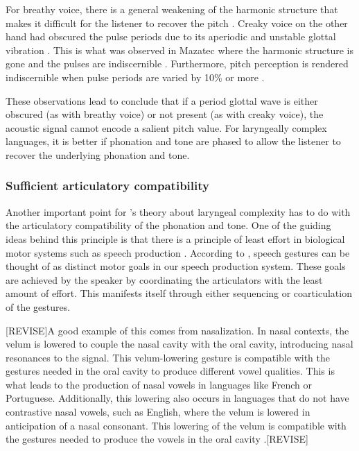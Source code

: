 For breathy voice, there is a general weakening
of the harmonic structure that makes it difficult for the listener to recover the pitch \citep{silvermanPhasingRecoverability1997}. Creaky voice on the other hand had obscured the pulse periods due to its aperiodic and unstable glottal vibration \citep{ladefogedSoundsWorldsLanguages1996}. This is what was observed in Mazatec where the harmonic structure is gone and the pulses are indiscernible \citep{kirkQuantifyingAcousticProperties1993}. Furthermore, pitch perception is rendered indiscernible when pulse periods are varied by 10\% or more \citep{rosenbergPitchDiscriminationJittered1966}.

These observations lead \citet{silvermanLaryngealComplexityOtomanguean1997} to conclude that if a period glottal wave is either obscured (as with breathy voice) or not present (as with creaky voice), the acoustic signal cannot encode a salient pitch value. For laryngeally complex languages, it is better if phonation and tone are phased to allow the listener to recover the underlying phonation and tone.

\subsubsection{Sufficient articulatory compatibility}\label{sec:sufficient_articulatory_compatibility}

Another important point for \citeauthor{silvermanLaryngealComplexityOtomanguean1997}'s theory about laryngeal complexity has to do with the articulatory compatibility of the phonation and tone. One of the guiding ideas behind this principle is that there is a principle of least effort in biological motor systems such as speech production \citep{lindblomEconomySpeechGestures1983}. According to \citet{lindblomEconomySpeechGestures1983}, speech gestures can be thought of as distinct motor goals in our speech production system. These goals are achieved by the speaker by coordinating the articulators with the least amount of effort. This manifests itself through either sequencing or coarticulation of the gestures.

[REVISE]A good example of this comes from nasalization. In nasal contexts, the velum is lowered to couple the nasal cavity with the oral cavity, introducing nasal resonances to the signal. This velum-lowering gesture is compatible with the gestures needed in the oral cavity to produce different vowel qualities. This is what leads to the production of nasal vowels in languages like French or Portuguese. Additionally, this lowering also occurs in languages that do not have contrastive nasal vowels, such as English, where the velum is lowered in anticipation of a nasal consonant. This lowering of the velum is compatible with the gestures needed to produce the vowels in the oral cavity \citep[e.g.,][]{ohalaPhoneticExplanationsNasal1975,chenAcousticCorrelatesEnglish1997,stylerAcousticalPerceptualFeatures2015}.[REVISE]

